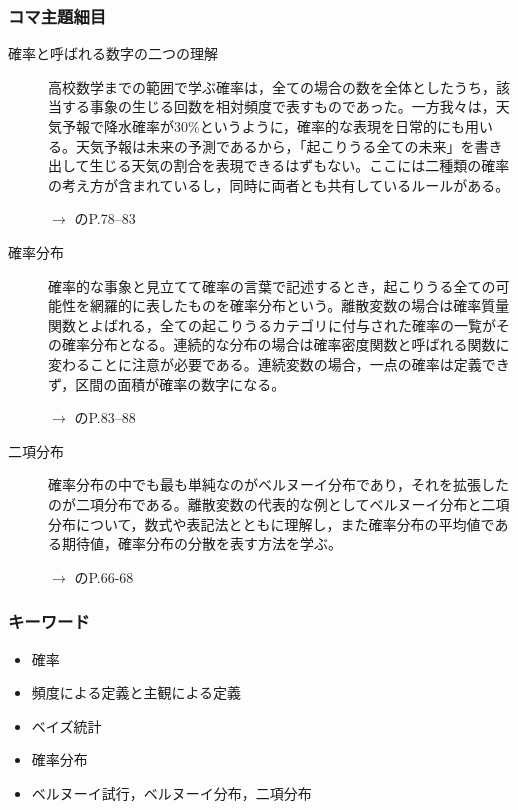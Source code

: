 \subsubsection{コマ主題細目}
\begin{description}

\item[確率と呼ばれる数字の二つの理解]高校数学までの範囲で学ぶ確率は，全ての場合の数を全体としたうち，該当する事象の生じる回数を相対頻度で表すものであった。一方我々は，天気予報で降水確率が30\%というように，確率的な表現を日常的にも用いる。天気予報は未来の予測であるから，「起こりうる全ての未来」を書き出して生じる天気の割合を表現できるはずもない。ここには二種類の確率の考え方が含まれているし，同時に両者とも共有しているルールがある。
\begin{flushright}
    $\to$ \citet{Maeda2017}のP.78--83
\end{flushright}

\item[確率分布]確率的な事象と見立てて確率の言葉で記述するとき，起こりうる全ての可能性を網羅的に表したものを確率分布という。離散変数の場合は確率質量関数とよばれる，全ての起こりうるカテゴリに付与された確率の一覧がその確率分布となる。連続的な分布の場合は確率密度関数と呼ばれる関数に変わることに注意が必要である。連続変数の場合，一点の確率は定義できず，区間の面積が確率の数字になる。
\begin{flushright}
    $\to$ \citet{Maeda2017}のP.83--88
\end{flushright}

\item[二項分布]確率分布の中でも最も単純なのがベルヌーイ分布であり，それを拡張したのが二項分布である。離散変数の代表的な例としてベルヌーイ分布と二項分布について，数式や表記法とともに理解し，また確率分布の平均値である期待値，確率分布の分散を表す方法を学ぶ。
\begin{flushright}
    $\to$ \citet{野島201903}のP.66-68
\end{flushright}

\end{description}
\subsubsection{キーワード}
\begin{itemize}
\item 確率
\item 頻度による定義と主観による定義
\item ベイズ統計
\item 確率分布
\item ベルヌーイ試行，ベルヌーイ分布，二項分布
\end{itemize}

